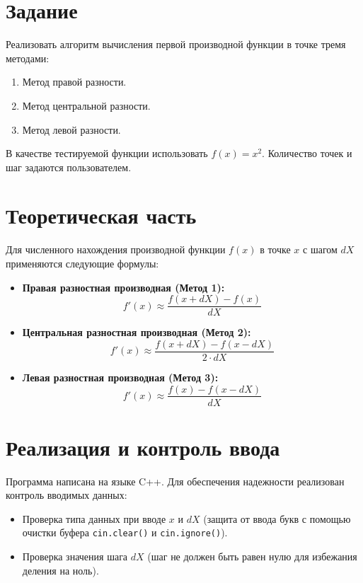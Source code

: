 \documentclass[12pt,a4paper]{article}
\begin{document}
\section{Задание}
Реализовать алгоритм вычисления первой производной функции в точке тремя методами:
\begin{enumerate}
    \item Метод правой разности.
    \item Метод центральной разности.
    \item Метод левой разности.
\end{enumerate}
В качестве тестируемой функции использовать $f(x) = x^2$. Количество точек и шаг задаются пользователем.
\section{Теоретическая часть}
Для численного нахождения производной функции $f(x)$ в точке $x$ с шагом $dX$ применяются следующие формулы:
\begin{itemize}
    \item \textbf{Правая разностная производная (Метод 1):}
    \begin{equation}
        f'(x) \approx \frac{f(x + dX) - f(x)}{dX}
    \end{equation}
    \item \textbf{Центральная разностная производная (Метод 2):}
    \begin{equation}
        f'(x) \approx \frac{f(x + dX) - f(x - dX)}{2 \cdot dX}
    \end{equation}
    \item \textbf{Левая разностная производная (Метод 3):}
    \begin{equation}
        f'(x) \approx \frac{f(x) - f(x - dX)}{dX}
    \end{equation}
\end{itemize}
\section{Реализация и контроль ввода}
Программа написана на языке C++. Для обеспечения надежности реализован контроль вводимых данных:
\begin{itemize}
    \item Проверка типа данных при вводе $x$ и $dX$ (защита от ввода букв с помощью очистки буфера \texttt{cin.clear()} и \texttt{cin.ignore()}).
    \item Проверка значения шага $dX$ (шаг не должен быть равен нулю для избежания деления на ноль).
\end{itemize}
\newpage
\end{document}
